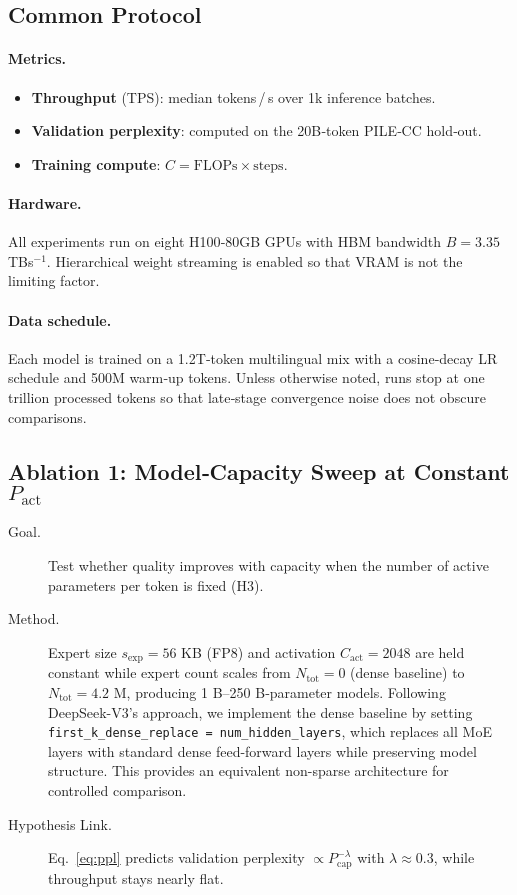 \documentclass[11pt]{article}
\begin{document}
\subsection{Common Protocol}

\paragraph{Metrics.}  
\begin{itemize}
  \item \textbf{Throughput} (TPS): median tokens\,/\,s over 1k inference
        batches.
  \item \textbf{Validation perplexity}: computed on the 20B‑token
        \textsc{PILE‑CC} hold‑out.
  \item \textbf{Training compute}: $C = \text{FLOPs}\times\text{steps}$.
\end{itemize}

\paragraph{Hardware.}  
All experiments run on eight H100‑80GB GPUs with
HBM bandwidth $B = 3.35$TBs$^{-1}$.
Hierarchical weight streaming is enabled so that VRAM is not the
limiting factor.

\paragraph{Data schedule.}  
Each model is trained on a 1.2T‑token multilingual mix with
a cosine‑decay LR schedule and 500M warm‑up tokens.
Unless otherwise noted, runs stop at one trillion processed tokens so
that late‑stage convergence noise does not obscure comparisons.

\subsection{Ablation 1: Model‑Capacity Sweep at Constant $P_{\mathrm{act}}$}
\begin{description}
  \item[Goal.]  Test whether quality improves with capacity
        when the number of active parameters per token is fixed (H3).
  \item[Method.]  
        Expert size $s_{\mathrm{exp}} = 56$ KB (FP8) and
        activation $C_{\mathrm{act}} = 2048$ are held constant while
        expert count scales from $N_{\mathrm{tot}} = 0$ (dense baseline)
        to $N_{\mathrm{tot}} = 4.2$ M, producing 1 B–250 B‑parameter
        models. Following DeepSeek-V3's approach, we implement the dense baseline by setting \texttt{first\_k\_dense\_replace = num\_hidden\_layers}, which replaces all MoE layers with standard dense feed-forward layers while preserving model structure. This provides an equivalent non-sparse architecture for controlled comparison.
  \item[Hypothesis Link.]  
        Eq.~\eqref{eq:ppl} predicts validation perplexity
        $\propto P_{\mathrm{cap}}^{-\lambda}$ with
        $\lambda \approx 0.3$, while throughput stays nearly flat.
\end{description}
\end{document}
